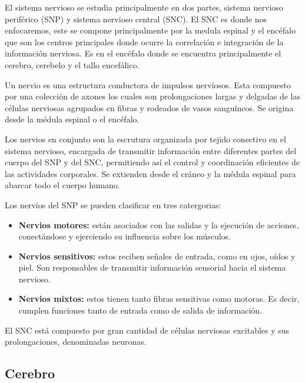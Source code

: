 El sistema nervioso se estudia principalmente en dos partes, sistema nervioso periférico (SNP) y sistema nervioso central (SNC). El SNC es donde nos enfocaremos, este se compone principalmente por la medula espinal y el encéfalo que son los centros principales donde ocurre la correlación e integración de la información nerviosa. Es en el encéfalo donde se encuentra principalmente el cerebro, cerebelo y el tallo encefálico.\parencite{sistNerv}   

Un nervio es una estructura conductora de impulsos nerviosos.
Esta compuesto por una colección de axones los cuales son prolongaciones largas y delgadas de las células nerviosas agrupados en fibras y rodeados de vasos sanguíneos.
 Se origina desde la médula espinal o el encéfalo. %

Los nervios en conjunto son la escrutura organizada por tejido conectivo en el sistema nervioso, encargada de transmitir información entre diferentes partes del cuerpo del SNP y del SNC, permitiendo así el control y coordinación eficientes de las actividades corporales. Se extienden desde el cráneo y la médula espinal para abarcar todo el cuerpo humano. \parencite{princNS5}

Los nervios del SNP se pueden clasificar en tres catergorias:

\begin{itemize}
\item \textbf{Nervios motores:} están asociados con las salidas y la ejecución de acciones, conectándose y ejerciendo su influencia sobre los músculos.
\item \textbf{Nervios sensitivos:} estos reciben señales de entrada, como en ojos, oídos y piel. Son responsables de transmitir información sensorial hacia el sistema nervioso.
\item \textbf{Nervios mixtos:} estos tienen tanto fibras sensitivas como motoras. Es decir, cumplen funciones tanto de entrada como de salida de información.
\end{itemize}

El SNC está compuesto por gran cantidad de células nerviosas excitables y sus prolongaciones, denominadas neuronas. \parencite{sistNerv}   %


\subsection{Cerebro}

